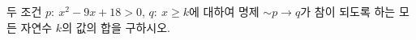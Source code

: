 두 조건 $p:\ x^2-9x+18>0$, $q:\ x\ge k$에 대하여 명제 ${\sim} p\longrightarrow q$가 참이 되도록 하는 모든 자연수 $k$의 값의 합을 구하시오.
